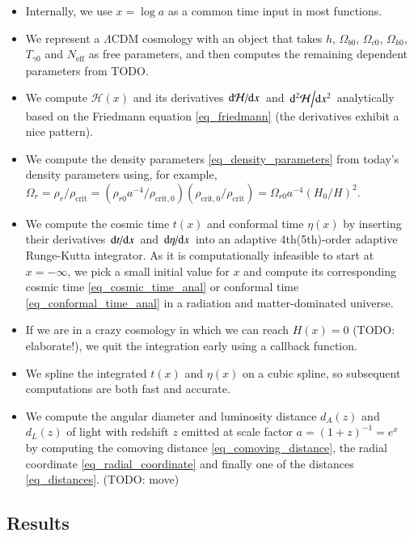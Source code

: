 \documentclass{aa}
\begin{document}
\begin{itemize}
	\item Internally, we use $x = \log a$ as a common time input in most functions.
	\item We represent a $\Lambda$CDM cosmology with an object that takes $h$, $\Omega_{b0}$, $\Omega_{c0}$, $\Omega_{k0}$, $T_{\gamma0}$ and $N_\text{eff}$ as free parameters, and then computes the remaining dependent parameters from TODO.
	\item We compute $\mathcal{H}(x)$ and its derivatives $\odv{\mathcal{H}}/{x}$ and $\odv[2]{\mathcal{H}}/{x}$ analytically based on the Friedmann equation \eqref{eq_friedmann} (the derivatives exhibit a nice pattern).
	\item We compute the density parameters \eqref{eq_density_parameters} from today's density parameters using, for example, $\Omega_r = \rho_r / \rho_\text{crit} = (\rho_{r0} a^{-4} / \rho_{\text{crit},0}) (\rho_{\text{crit},0} / \rho_\text{crit}) = \Omega_{r0} a^{-4} (H_0 / H)^2$.
	\item We compute the cosmic time $t(x)$ and conformal time $\eta(x)$ by inserting their derivatives $\odv{t}/{x}$ and $\odv{\eta}/{x}$ into an adaptive 4th(5th)-order adaptive Runge-Kutta integrator.
	      As it is computationally infeasible to start at $x=-\infty$, we pick a small initial value for $x$ and compute its corresponding cosmic time \eqref{eq_cosmic_time_anal} or conformal time \eqref{eq_conformal_time_anal} in a radiation and matter-dominated universe.
	\item If we are in a crazy cosmology in which we can reach $H(x) = 0$ (TODO: elaborate!), we quit the integration early using a callback function.
	\item We spline the integrated $t(x)$ and $\eta(x)$ on a cubic spline, so subsequent computations are both fast and accurate.
	\item We compute the angular diameter and luminosity distance $d_A(z)$ and $d_L(z)$ of light with redshift $z$ emitted at scale factor $a = (1+z)^{-1} = e^x$ by computing the comoving distance \eqref{eq_comoving_distance}, the radial coordinate \eqref{eq_radial_coordinate} and finally one of the distances \eqref{eq_distances}. (TODO: move)
\end{itemize}

\subsection{Results}
\end{document}
